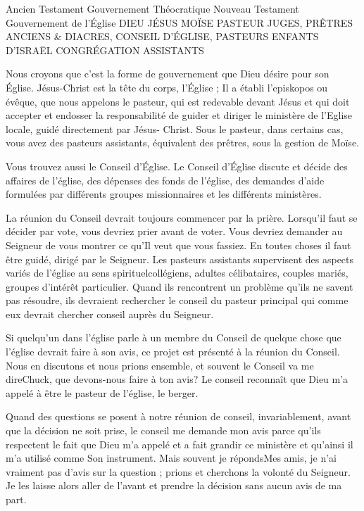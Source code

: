 Ancien Testament
Gouvernement Théocratique
Nouveau Testament
Gouvernement de l’Église
DIEU JÉSUS
MOÏSE PASTEUR
JUGES, PRÊTRES ANCIENS \& DIACRES, CONSEIL D’ÉGLISE, PASTEURS
ENFANTS D’ISRAËL CONGRÉGATION
ASSISTANTS

Nous croyons que c’est la forme de gouvernement que Dieu désire pour son Église. Jésus-Christ est la tête du corps,
l’Église ; Il a établi l’episkopos ou évêque, que nous appelons le pasteur, qui est redevable devant Jésus et qui doit
accepter et endosser la responsabilité de guider et diriger le ministère de l’Eglise locale, guidé directement par Jésus-
Christ. Sous le pasteur, dans certains cas, vous avez des pasteurs assistants, équivalent des prêtres, sous la gestion
de Moïse.

Vous trouvez aussi le Conseil d’Église. Le Conseil d’Église discute et décide des affaires de l’église, des dépenses des
fonds de l’église, des demandes d’aide formulées par différents groupes missionnaires et les différents ministères.

La réunion du Conseil devrait toujours commencer par la prière. Lorsqu’il faut se décider par vote, vous devriez prier
avant de voter. Vous devriez demander au Seigneur de vous montrer ce qu’Il veut que vous fassiez. En toutes choses
il faut être guidé, dirigé par le Seigneur. Les pasteurs assistants supervisent des aspects variés de l’église au sens
spirituel\frcolon collégiens, adultes célibataires, couples mariés, groupes d’intérêt particulier. Quand ils rencontrent un
problème qu’ils ne savent pas résoudre, ils devraient rechercher le conseil du pasteur principal qui comme eux devrait
chercher conseil auprès du Seigneur.

Si quelqu’un dans l’église parle à un membre du Conseil de quelque chose que l’église devrait faire à son avis, ce
projet est présenté à la réunion du Conseil. Nous en discutons et nous prions ensemble, et souvent le Conseil va me
dire\frcolon\og Chuck, que devons-nous faire à ton avis?\fg{} Le conseil reconnaît que Dieu m’a appelé à être le pasteur de
l’église, le berger.

Quand des questions se posent à notre réunion de conseil, invariablement, avant que la décision ne soit prise, le
conseil me demande mon avis parce qu’ils respectent le fait que Dieu m’a appelé et a fait grandir ce ministère et
qu'ainsi il m’a utilisé comme Son instrument. Mais souvent je réponds\frcolon\og Mes amis, je n’ai vraiment pas d’avis sur la
question ; prions et cherchons la volonté du Seigneur.\fg{} Je les laisse alors aller de l’avant et prendre la décision sans
aucun avis de ma part.


